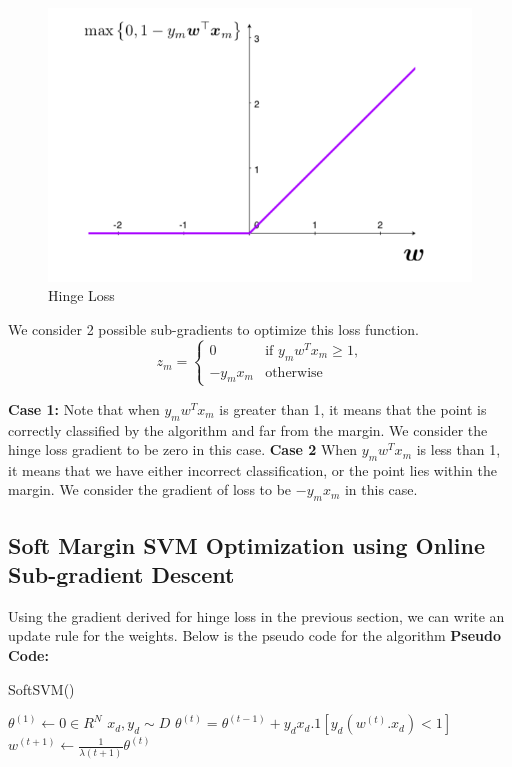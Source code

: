 \documentclass[11pt]{article}
\begin{document}
\begin{figure}[h!]
\centering
\includegraphics[scale=0.5]{images/hinge.png}
\caption{Hinge Loss}
\end{figure}
We consider 2 possible sub-gradients to optimize this loss function.
\[
    z_m =
    \begin{cases}
        0 & \text{if $y_mw^Tx_m \geq 1$,}\\
        -y_mx_m & \text{otherwise}
    \end{cases}
\]

\textbf{Case 1:}
Note that when $y_mw^Tx_m$ is greater than 1, it means that the point is correctly classified by the algorithm and far from the margin. We consider the hinge loss gradient to be zero in this case.
\newline\textbf{Case 2} 
When $y_mw^Tx_m$ is less than 1, it means that we have either incorrect classification, or the point lies within the margin. We consider the gradient of loss to be $-y_mx_m$ in this case.

\subsection{Soft Margin SVM Optimization using Online Sub-gradient Descent}
Using the gradient derived for hinge loss in the previous section, we can write an update rule for the weights. Below is the pseudo code for the algorithm
	\textbf{Pseudo Code:}
	\begin{algorithm}
	\caption{SoftSVM(\lambda)}
    \begin{algorithmic}[1]
    \STATE $\theta^{(1)} \leftarrow 0 \in R^N$ 
    \STATE $x_d, y_d \sim D$ 
    \STATE $\theta^{(t)} = \theta^{(t-1)} + y_dx_d.1[y_d(w^{(t)}.x_d) < 1]$ 
    \STATE $w^{(t+1)} \leftarrow \frac{1}{\lambda (t+1)}\theta^{(t)}$ 
    \ENDFOR
    \end{algorithmic}
	\end{algorithm}
\end{document}
